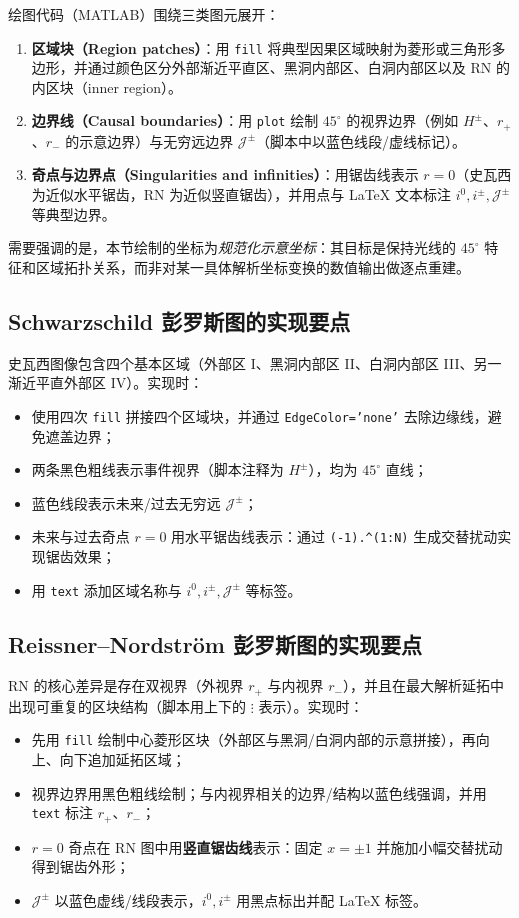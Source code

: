 \documentclass[a4paper,12pt]{article}
\begin{document}
绘图代码（MATLAB）围绕三类图元展开：
\begin{enumerate}
    \item \textbf{区域块（Region patches）}：用 \texttt{fill} 将典型因果区域映射为菱形或三角形多边形，并通过颜色区分外部渐近平直区、黑洞内部区、白洞内部区以及 RN 的内区块（inner region）。
    \item \textbf{边界线（Causal boundaries）}：用 \texttt{plot} 绘制 $45^\circ$ 的视界边界（例如 $H^\pm$、$r_+$、$r_-$ 的示意边界）与无穷远边界 $\mathcal{J}^\pm$（脚本中以蓝色线段/虚线标记）。
    \item \textbf{奇点与边界点（Singularities and infinities）}：用锯齿线表示 $r=0$（史瓦西为近似水平锯齿，RN 为近似竖直锯齿），并用点与 LaTeX 文本标注 $i^0,i^\pm,\mathcal{J}^\pm$ 等典型边界。
\end{enumerate}
需要强调的是，本节绘制的坐标为\emph{规范化示意坐标}：其目标是保持光线的 $45^\circ$ 特征和区域拓扑关系，而非对某一具体解析坐标变换的数值输出做逐点重建。

\subsection{Schwarzschild 彭罗斯图的实现要点}

史瓦西图像包含四个基本区域（外部区 I、黑洞内部区 II、白洞内部区 III、另一渐近平直外部区 IV）。实现时：
\begin{itemize}
    \item 使用四次 \texttt{fill} 拼接四个区域块，并通过 \texttt{EdgeColor='none'} 去除边缘线，避免遮盖边界；
    \item 两条黑色粗线表示事件视界（脚本注释为 $H^\pm$），均为 $45^\circ$ 直线；
    \item 蓝色线段表示未来/过去无穷远 $\mathcal{J}^\pm$；
    \item 未来与过去奇点 $r=0$ 用水平锯齿线表示：通过 \verb|(-1).^(1:N)| 生成交替扰动实现锯齿效果；
    \item 用 \texttt{text} 添加区域名称与 $i^0,i^\pm,\mathcal{J}^\pm$ 等标签。
\end{itemize}

\subsection{Reissner--Nordström 彭罗斯图的实现要点}

RN 的核心差异是存在双视界（外视界 $r_+$ 与内视界 $r_-$），并且在最大解析延拓中出现可重复的区块结构（脚本用上下的 $\vdots$ 表示）。实现时：
\begin{itemize}
    \item 先用 \texttt{fill} 绘制中心菱形区块（外部区与黑洞/白洞内部的示意拼接），再向上、向下追加延拓区域；
    \item 视界边界用黑色粗线绘制；与内视界相关的边界/结构以蓝色线强调，并用 \texttt{text} 标注 $r_+$、$r_-$；
    \item $r=0$ 奇点在 RN 图中用\textbf{竖直锯齿线}表示：固定 $x=\pm 1$ 并施加小幅交替扰动得到锯齿外形；
    \item $\mathcal{J}^\pm$ 以蓝色虚线/线段表示，$i^0,i^\pm$ 用黑点标出并配 LaTeX 标签。
\end{itemize}
\end{document}
